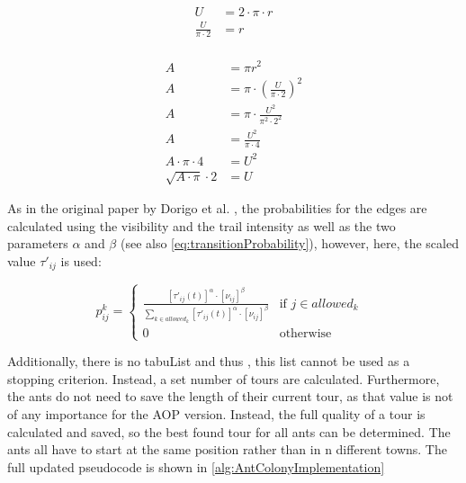 \begin{minipage}[t][2.5cm][b]{0.4\textwidth}
	\begin{equation}
		\label{eq:scaleArea1}
		\begin{split}
			U &= 2 \cdot \pi \cdot r\\
			\frac{U}{\pi \cdot 2} &= r\\
		\end{split}
	\end{equation}
\end{minipage}
\begin{minipage}[t][2.5cm][b]{0.4\textwidth}
	\begin{equation}
		\label{eq:scaleArea2}
		\begin{split}
			A &= \pi r^2 \\
			A &= \pi \cdot \left(\frac{U}{\pi \cdot 2}\right)^2\\
			A &= \pi \cdot \frac{U^2}{\pi^2 \cdot 2^2}\\
			A &= \frac{U^2}{\pi \cdot 4}\\
			A \cdot \pi \cdot 4 &= U^2\\
			\sqrt{A \cdot \pi} \cdot 2 &= U
		\end{split}
	\end{equation}
\end{minipage}

As in the original paper by Dorigo et al. \cite{dorigo_ant_1996}, the probabilities for the edges are calculated using the visibility and the trail intensity as well as the two parameters $\alpha$ and $\beta$ (see also \ref{eq:transitionProbability}), however, here, the scaled value $\tau'_{ij}$ is used:

\begin{equation}\label{eq:transitionProbability2}
	p_{ij}^k = \begin{cases}
		\frac{[\tau'_{ij}(t)]^{\alpha} \cdot [\nu_{ij}]^{\beta}}{\sum_{k \in allowed_k} [\tau'_{ij}(t)]^{\alpha} \cdot [\nu_{ij}]^{\beta}} &\text{if $j \in allowed_k$ }\\
		0 &\text{otherwise}
	\end{cases}
\end{equation}


Additionally, there is no tabuList and thus , this list cannot be used as a stopping criterion. 
Instead, a set number of tours are calculated.
Furthermore, the ants do not need to save the length of their current tour, as that value is not of any importance for the AOP version. 
Instead, the full quality of a tour is calculated and saved, so the best found tour for all ants can be determined.
The ants all have to start at the same position rather than in n different towns. 
The full updated pseudocode is shown in \ref{alg:AntColonyImplementation}


